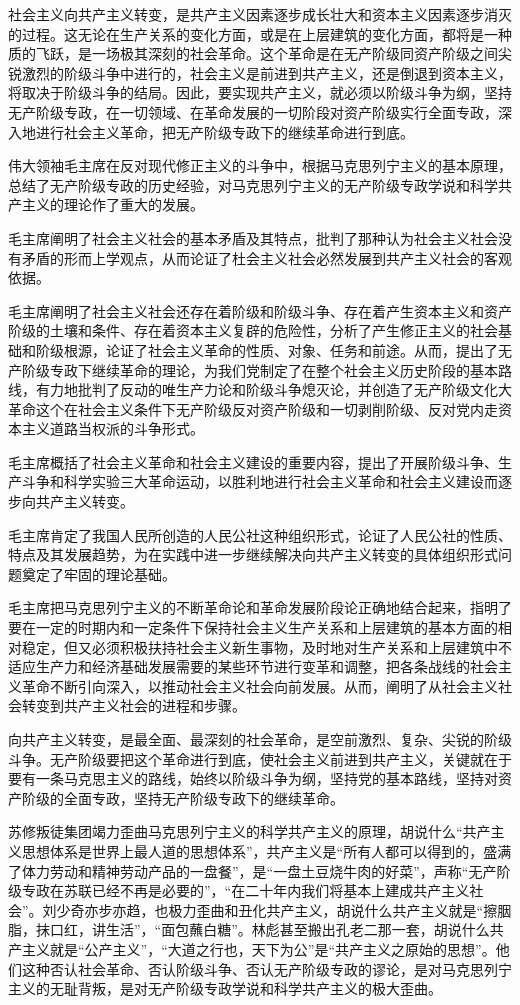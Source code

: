 \documentclass{book}
\begin{document}
社会主义向共产主义转变，是共产主义因素逐步成长壮大和资本主义因素逐步消灭的过程。这无论在生产关系的变化方面，或是在上层建筑的变化方面，都将是一种质的飞跃，是一场极其深刻的社会革命。这个革命是在无产阶级同资产阶级之间尖锐激烈的阶级斗争中进行的，社会主义是前进到共产主义，还是倒退到资本主义，将取决于阶级斗争的结局。因此，要实现共产主义，就必须以阶级斗争为纲，坚持无产阶级专政，在一切领域、在革命发展的一切阶段对资产阶级实行全面专政，深入地进行社会主义革命，把无产阶级专政下的继续革命进行到底。

伟大领袖毛主席在反对现代修正主义的斗争中，根据马克思列宁主义的基本原理，总结了无产阶级专政的历史经验，对马克思列宁主义的无产阶级专政学说和科学共产主义的理论作了重大的发展。

毛主席阐明了社会主义社会的基本矛盾及其特点，批判了那种认为社会主义社会没有矛盾的形而上学观点，从而论证了杜会主义社会必然发展到共产主义社会的客观依据。

毛主席阐明了社会主义社会还存在着阶级和阶级斗争、存在着产生资本主义和资产阶级的土壤和条件、存在着资本主义复辟的危险性，分析了产生修正主义的社会基础和阶级根源，论证了社会主义革命的性质、对象、任务和前途。从而，提出了无产阶级专政下继续革命的理论，为我们党制定了在整个社会主义历史阶段的基本路线，有力地批判了反动的唯生产力论和阶级斗争熄灭论，并创造了无产阶级文化大革命这个在社会主义条件下无产阶级反对资产阶级和一切剥削阶级、反对党内走资本主义道路当权派的斗争形式。

毛主席概括了社会主义革命和社会主义建设的重要内容，提出了开展阶级斗争、生产斗争和科学实验三大革命运动，以胜利地进行社会主义革命和社会主义建设而逐步向共产主义转变。

毛主席肯定了我国人民所创造的人民公社这种组织形式，论证了人民公社的性质、特点及其发展趋势，为在实践中进一步继续解决向共产主义转变的具体组织形式问题奠定了牢固的理论基础。

毛主席把马克思列宁主义的不断革命论和革命发展阶段论正确地结合起来，指明了要在一定的时期内和一定条件下保持社会主义生产关系和上层建筑的基本方面的相对稳定，但又必须积极扶持社会主义新生事物，及时地对生产关系和上层建筑中不适应生产力和经济基础发展需要的某些环节进行变革和调整，把各条战线的社会主义革命不断引向深入，以推动社会主义社会向前发展。从而，阐明了从社会主义社会转变到共产主义社会的进程和步骤。

向共产主义转变，是最全面、最深刻的社会革命，是空前激烈、复杂、尖锐的阶级斗争。无产阶级要把这个革命进行到底，使社会主义前进到共产主义，关键就在于要有一条马克思主义的路线，始终以阶级斗争为纲，坚持党的基本路线，坚持对资产阶级的全面专政，坚持无产阶级专政下的继续革命。

苏修叛徒集团竭力歪曲马克思列宁主义的科学共产主义的原理，胡说什么“共产主义思想体系是世界上最人道的思想体系”，共产主义是“所有人都可以得到的，盛满了体力劳动和精神劳动产品的一盘餐”，是“一盘土豆烧牛肉的好菜”，声称“无产阶级专政在苏联已经不再是必要的”，“在二十年内我们将基本上建成共产主义社会”。刘少奇亦步亦趋，也极力歪曲和丑化共产主义，胡说什么共产主义就是“擦胭脂，抹口红，讲生活”，“面包蘸白糖”。林彪甚至搬出孔老二那一套，胡说什么共产主义就是“公产主义”，“大道之行也，天下为公”是“共产主义之原始的思想”。他们这种否认社会革命、否认阶级斗争、否认无产阶级专政的谬论，是对马克思列宁主义的无耻背叛，是对无产阶级专政学说和科学共产主义的极大歪曲。
\end{document}
